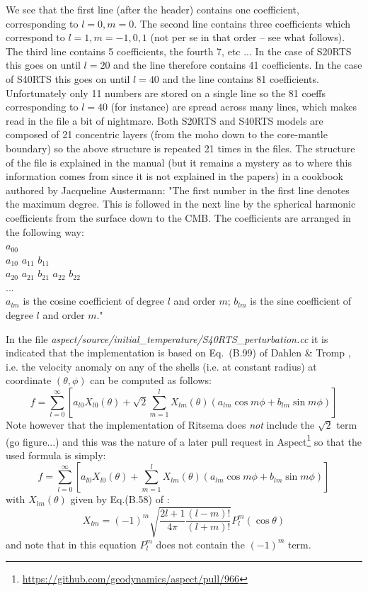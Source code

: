 We see that the first line (after the header) contains one coefficient, corresponding to ${l=0},{m=0}$. 
The second line contains three coefficients which correspond to ${l=1},{m=-1,0,1}$ (not 
per se in that order -- see what follows). The third line contains 5 
coefficients, the fourth 7, etc ... 
In the case of S20RTS this goes on until $l=20$ and the line therefore contains 41 coefficients.
In the case of S40RTS this goes on until $l=40$ and the line contains 81 coefficients.
Unfortunately only 11 numbers are stored on a single line so the 81 coeffs corresponding to $l=40$ (for instance)
are spread across many lines, which makes read in the file a bit of nightmare. 
Both S20RTS and S40RTS models are composed of 21 concentric layers (from the moho down to the core-mantle boundary) 
so the above structure is repeated 21 times in the files. 
The structure of the file is explained in the \aspect manual (but it remains a mystery 
as to where this information comes from since it is not explained in the papers) 
in a cookbook authored by Jacqueline Austermann:  
{\color{brown}
"The first number in the first line denotes the maximum degree. This is followed in
the next line by the spherical harmonic coefficients from the surface down to the
CMB. The coefficients are arranged in the following way:\\
$a_{00}$ \\
$a_{10}$ $a_{11}$ $b_{11}$ \\
$a_{20}$ $a_{21}$ $b_{21}$ $a_{22}$ $b_{22}$ \\
... \\
$a_{lm}$ is the cosine coefficient of degree $l$ and order $m$; $b_{lm}$ is
the sine coefficient of degree $l$ and order $m$."}

In the file {\sl aspect/source/initial\_temperature/S40RTS\_perturbation.cc} it is 
indicated that the implementation is based on Eq.~(B.99) of Dahlen \& Tromp \cite{datr98}, 
i.e. the velocity anomaly on any of the shells 
(i.e. at constant radius) at coordinate $(\theta,\phi)$ can be computed as follows:
\[
f = \sum_{l=0}^\infty \left[a_{l0} X_{l0}(\theta) + \sqrt{2} \sum_{m=1}^l X_{lm}(\theta) 
\left(a_{lm} \cos m\phi + b_{lm} \sin m\phi \right) \right]
\]
Note however that the implementation of Ritsema does {\it not} include the $\sqrt{2}$ term (go figure...) and this 
was the nature of a later pull request in Aspect\footnote{\url{https://github.com/geodynamics/aspect/pull/966}} 
so that the used formula is simply:
\[
\boxed{
f = \sum_{l=0}^\infty \left[a_{l0} X_{l0}(\theta) + \sum_{m=1}^l X_{lm}(\theta) 
(a_{lm} \cos m\phi + b_{lm} \sin m\phi) \right]
}
\]
with $X_{lm}(\theta)$ given by Eq.(B.58) of  \cite{datr98}:
\[
\boxed{
X_{lm} = (-1)^m \sqrt{ \frac{2l+1}{4\pi} \frac{(l-m)!}{(l+m)!} } P_l^m(\cos\theta)
}
\]
and note that in this equation $P_l^m$ does not contain the $(-1)^m$ term.

